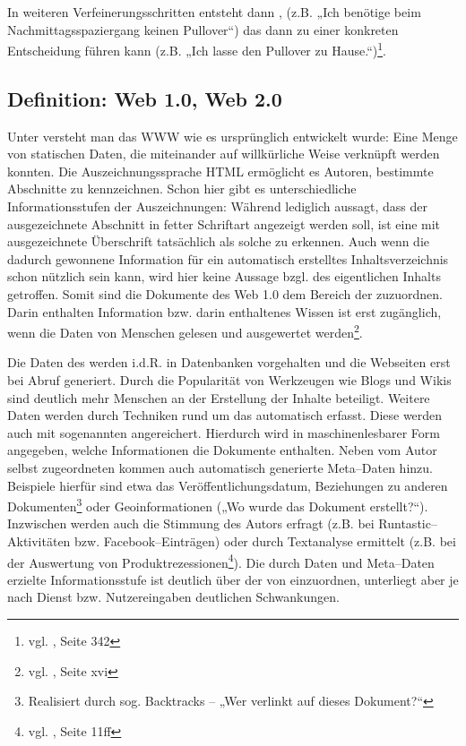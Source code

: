 In weiteren Verfeinerungsschritten entsteht dann , (z.B. „Ich benötige beim Nachmittagsspaziergang keinen Pullover“) das dann zu einer konkreten Entscheidung führen kann (z.B. „Ich lasse den Pullover zu Hause.“)\footnote{vgl. \cite{taylor}, Seite 342}.

\subsection{Definition: Web 1.0, Web 2.0}

Unter  versteht man das \ac{WWW} wie es ursprünglich entwickelt wurde: Eine Menge von statischen Daten, die miteinander auf willkürliche Weise verknüpft werden konnten. Die Auszeichnungssprache \ac{HTML} ermöglicht es Autoren, bestimmte Abschnitte zu kennzeichnen. Schon hier gibt es unterschiedliche Informationsstufen der Auszeichnungen: Während  lediglich aussagt, dass der ausgezeichnete Abschnitt in fetter Schriftart angezeigt werden soll, ist eine mit  ausgezeichnete Überschrift tatsächlich als solche zu erkennen. Auch wenn die dadurch gewonnene Information für ein automatisch erstelltes Inhaltsverzeichnis schon nützlich sein kann, wird hier keine Aussage bzgl. des eigentlichen Inhalts getroffen. Somit sind die Dokumente des Web 1.0 dem Bereich der  zuzuordnen. Darin enthalten Information bzw. darin enthaltenes Wissen ist erst zugänglich, wenn die Daten von Menschen gelesen und ausgewertet werden\footnote{vgl. \cite{alkhatib}, Seite xvi}.

Die Daten des  werden i.d.R. in Datenbanken vorgehalten und die Webseiten erst bei Abruf generiert. Durch die Popularität von Werkzeugen wie Blogs und Wikis sind deutlich mehr Menschen an der Erstellung der Inhalte beteiligt. Weitere Daten werden durch Techniken rund um das  automatisch erfasst. Diese werden auch mit sogenannten  angereichert. Hierdurch wird in maschinenlesbarer Form angegeben, welche Informationen die Dokumente enthalten. Neben vom Autor selbst zugeordneten  kommen auch automatisch generierte Meta--Daten hinzu. Beispiele hierfür sind etwa das Veröffentlichungsdatum, Beziehungen zu anderen Dokumenten\footnote{Realisiert durch sog. Backtracks -- „Wer verlinkt auf dieses Dokument?“} oder Geoinformationen („Wo wurde das Dokument erstellt?“). Inzwischen werden auch die Stimmung des Autors erfragt (z.B. bei Runtastic–Aktivitäten bzw. Facebook--Einträgen) oder durch Textanalyse ermittelt (z.B. bei der Auswertung von Produktrezessionen\footnote{vgl. \cite{sprejz}, Seite 11ff}). Die durch Daten und Meta--Daten erzielte Informationsstufe ist deutlich über der von  einzuordnen, unterliegt aber je nach Dienst bzw. Nutzereingaben deutlichen Schwankungen.

